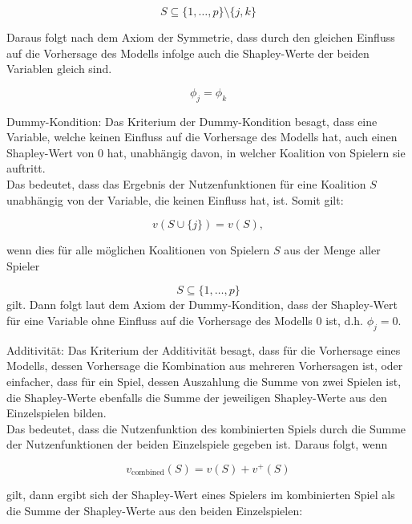 \documentclass[12pt,titlepage,oneside]{book}
\begin{document}
\begin{equation}
S \subseteq \{1,\ldots,p\} \setminus \{j,k\}
\end{equation}

Daraus folgt nach dem Axiom der Symmetrie, dass durch den gleichen Einfluss auf die Vorhersage des Modells infolge auch die Shapley-Werte der beiden Variablen gleich sind.

\begin{equation}
\phi_j = \phi_k
\end{equation}

Dummy-Kondition: Das Kriterium der Dummy-Kondition besagt, dass eine Variable, welche keinen Einfluss auf die Vorhersage des Modells hat, auch einen Shapley-Wert von 0 hat, unabhängig davon, in welcher Koalition von Spielern sie auftritt. \\
Das bedeutet, dass das Ergebnis der Nutzenfunktionen für eine Koalition $S$ unabhängig von der Variable, die keinen Einfluss hat, ist. Somit gilt:

\begin{equation} \label{Shapley-Dummy}
v(S \cup \{j\}) = v(S),
\end{equation}

wenn dies für alle möglichen Koalitionen von Spielern $S$ aus der Menge aller Spieler 

\begin{equation}
S \subseteq \{1,\ldots,p\}
\end{equation}
gilt. Dann folgt laut dem Axiom der Dummy-Kondition, dass der Shapley-Wert für eine Variable ohne Einfluss auf die Vorhersage des Modells $0$ ist, d.h. $\phi_j = 0$.


\newpage
Additivität: Das Kriterium der Additivität besagt, dass für die Vorhersage eines Modells, dessen Vorhersage die Kombination aus mehreren Vorhersagen ist, oder einfacher, dass für ein Spiel, dessen Auszahlung die Summe von zwei Spielen ist, die Shapley-Werte ebenfalls die Summe der jeweiligen Shapley-Werte aus den Einzelspielen bilden.\\
Das bedeutet, dass die Nutzenfunktion des kombinierten Spiels durch die Summe der Nutzenfunktionen der beiden Einzelspiele gegeben ist. Daraus folgt, wenn

\begin{equation}
v_{\text{combined}}(S) = v(S) + v^+(S)
\end{equation}

gilt, dann ergibt sich der Shapley-Wert eines Spielers im kombinierten Spiel als die Summe der Shapley-Werte aus den beiden Einzelspielen:
\end{document}
